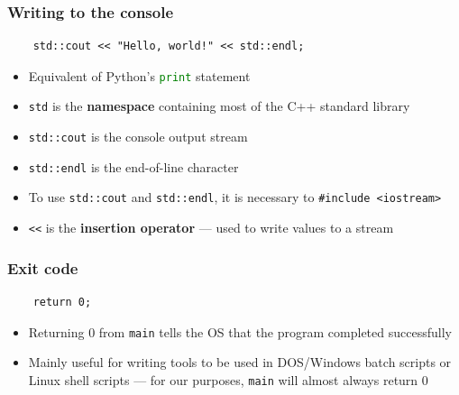 \begin{frame}[fragile]
	\frametitle{Writing to the console}
	\begin{lstlisting}
    std::cout << "Hello, world!" << std::endl;
	\end{lstlisting}
	\pause
	\begin{itemize}
		\item Equivalent of Python's \lstinline[language=Python]{print} statement \pause
		\item \lstinline{std} is the \textbf{namespace} containing most of the C++ standard library \pause
		\item \lstinline{std::cout} is the console output stream \pause
		\item \lstinline{std::endl} is the end-of-line character \pause
		\item To use \lstinline{std::cout} and \lstinline{std::endl}, it is necessary to
			\lstinline{#include <iostream>} \pause
		\item \lstinline{<<} is the \textbf{insertion operator} --- used to write values to a stream
	\end{itemize}
\end{frame}

\begin{frame}[fragile]
	\frametitle{Exit code}
	\begin{lstlisting}
    return 0;
	\end{lstlisting}
	\pause
	\begin{itemize}
		\item Returning 0 from \lstinline{main} tells the OS that the program completed successfully \pause
		\item Mainly useful for writing tools to be used in DOS/Windows batch scripts or Linux shell scripts ---
			for our purposes, \lstinline{main} will almost always return 0
	\end{itemize}
\end{frame}
